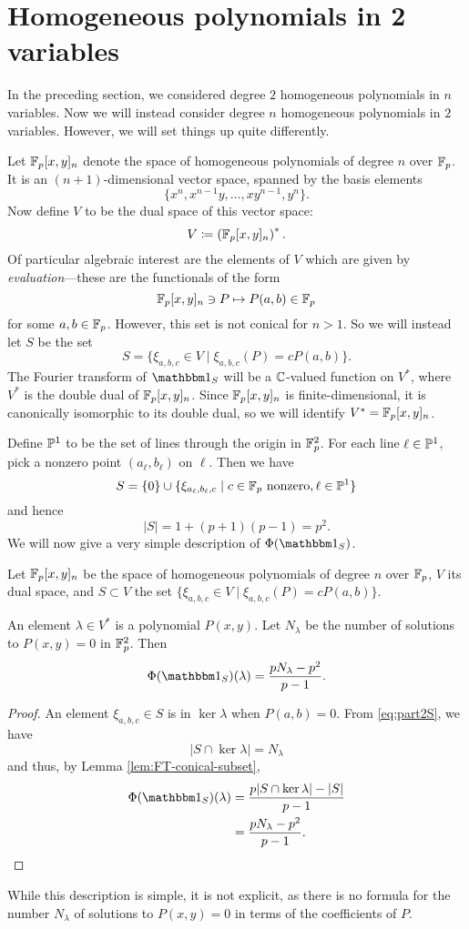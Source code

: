 \section{Homogeneous polynomials in 2 variables}\label{sec:part2}
In the preceding section, we considered degree $2$ homogeneous polynomials in $n$ variables. Now we will instead consider degree $n$ homogeneous polynomials in $2$ variables. However, we will set things up quite differently.

Let $\F_p[x,y]_n$ denote the space of homogeneous polynomials of degree $n$ over $\F_p$. It is an $(n+1)$-dimensional vector space, spanned by the basis elements
\[
	\{x^n, x^{n-1}y, \ldots, xy^{n-1}, y^n\}.
\]
Now define $V$ to be the dual space of this vector space:
\[
	V \coloneqq \left(\F_p[x,y]_n\right)^*.
\]
Of particular algebraic interest are the elements of $V$ which are given by \emph{evaluation}---these are the functionals of the form
\[
	\F_p[x,y]_n \ni P \mapsto P(a,b) \in \F_p
\]
for some $a,b\in \F_p$. However, this set is not conical for $n>1$. So we will instead let $S$ be the set
\[
	S=\{\xi_{a,b,c} \in V \mid \xi_{a,b,c}(P) = cP(a,b)\}.
\]
The Fourier transform of $\IND_S$ will be a $\C$-valued function on $V^*$, where $V^*$ is the double dual of $\F_p[x,y]_n$. Since $\F_p[x,y]_n$ is finite-dimensional, it is canonically isomorphic to its double dual, so we will identify $V^* = \F_p[x,y]_n$.

Define $\P^1$ to be the set of lines through the origin in $\F_p^2$. For each line $\ell \in \P^1$, pick a nonzero point $(a_\ell,b_\ell)$ on $\ell$. Then we have
\begin{equation}\label{eq:part2S}
	S = \{0\} \cup \{\xi_{a_\ell,b_\ell,c} \mid c\in \F_p \text{ nonzero}, \ell \in \P^1 \}
\end{equation}
and hence
\[
	|S| = 1 + (p+1)(p-1) = p^2.
\]
We will now give a very simple description of $\Phi(\IND_S)$.
\begin{thm}\label{thm:part2thm}
	Let $\F_p[x,y]_n$ be the space of homogeneous polynomials of degree $n$ over $\F_p$, $V$ its dual space, and $S\subset V$ the set $\{\xi_{a,b,c} \in V \mid \xi_{a,b,c}(P) = cP(a,b)\}$.
	
	An element $\lambda \in V^*$ is a polynomial $P(x,y)$. Let $N_\lambda$ be the number of solutions to $P(x,y)=0$ in $\F_p^2$. Then
	\[
		\Phi(\IND_S)(\lambda) = \frac{pN_\lambda - p^2}{p-1}.
	\]
\end{thm}
\begin{proof}
	An element $\xi_{a,b,c}\in S$ is in $\ker \lambda$ when $P(a,b) = 0$. From \eqref{eq:part2S}, we have
	\[
		|S \cap \ker \lambda| = N_\lambda
	\]
	and thus, by Lemma \ref{lem:FT-conical-subset},
	\begin{align*}
		\Phi (\IND_S) (\lambda) &= \frac{p|S\cap \ker \lambda| - |S|}{p-1}\\
		&= \frac{pN_\lambda - p^2}{p-1}.\qedhere
	\end{align*}
\end{proof}
While this description is simple, it is not explicit, as there is no formula for the number $N_\lambda$ of solutions to $P(x,y) = 0$ in terms of the coefficients of $P$.

